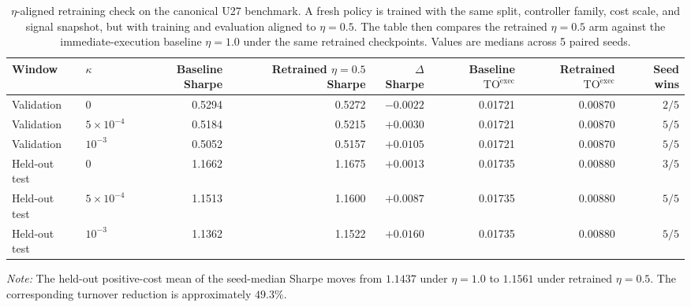 \documentclass[10pt,twocolumn]{article}
\newcommand{\TOexec}{\mathrm{TO}^{\mathrm{exec}}}
\begin{document}
\begin{table}[H]
\centering
\scriptsize
\caption{$\eta$-aligned retraining check on the canonical U27 benchmark. A fresh policy is trained with the same split, controller family, cost scale, and signal snapshot, but with training and evaluation aligned to $\eta=0.5$. The table then compares the retrained $\eta=0.5$ arm against the immediate-execution baseline $\eta=1.0$ under the same retrained checkpoints. Values are medians across 5 paired seeds.}
\label{tab:retrain_eta05}
\begin{tabular}{@{}llrrrrrr@{}}
\toprule
Window & $\kappa$ & Baseline Sharpe & Retrained $\eta=0.5$ Sharpe & $\Delta$Sharpe & Baseline $\overline{\TOexec}$ & Retrained $\overline{\TOexec}$ & Seed wins \\
\midrule
Validation & $0$ & 0.5294 & 0.5272 & $-0.0022$ & 0.01721 & 0.00870 & $2/5$ \\
Validation & $5\times10^{-4}$ & 0.5184 & 0.5215 & $+0.0030$ & 0.01721 & 0.00870 & $5/5$ \\
Validation & $10^{-3}$ & 0.5052 & 0.5157 & $+0.0105$ & 0.01721 & 0.00870 & $5/5$ \\
Held-out test & $0$ & 1.1662 & 1.1675 & $+0.0013$ & 0.01735 & 0.00880 & $3/5$ \\
Held-out test & $5\times10^{-4}$ & 1.1513 & 1.1600 & $+0.0087$ & 0.01735 & 0.00880 & $5/5$ \\
Held-out test & $10^{-3}$ & 1.1362 & 1.1522 & $+0.0160$ & 0.01735 & 0.00880 & $5/5$ \\
\bottomrule
\end{tabular}
\par\vspace{2pt}\raggedright\footnotesize{\textit{Note:} The held-out positive-cost mean of the seed-median Sharpe moves from $1.1437$ under $\eta=1.0$ to $1.1561$ under retrained $\eta=0.5$. The corresponding turnover reduction is approximately $49.3\%$.}
\end{table}
\end{document}
